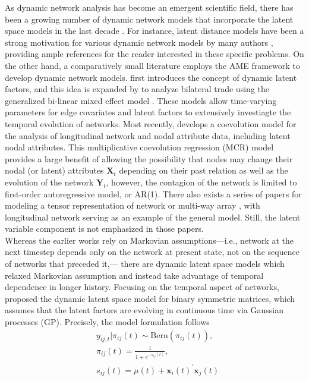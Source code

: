 \documentclass[a4paper]{article}
\begin{document}
As dynamic network analysis has become an emergent scientific field, there has been a growing number of dynamic network models that incorporate the latent space models in the last decade \citep{kim2017review}. For instance, latent distance models have been a strong motivation for various dynamic network models by many authors \citep{sarkar2005dynamic,sarkar2007latent,sewell2015latent,sewell2016latent,friel2016interlocking}, providing ample references for the reader interested in these specific problems. On the other hand, a comparatively small literature employs the AME framework to develop dynamic network models. \cite{ward2007persistent} first introduces the concept of dynamic latent factors, and this idea is expanded by \cite{ward2013gravity} to analyze bilateral trade using the generalized bi-linear mixed effect model \citep{hoff2005bilinear}. These models allow time-varying parameters for edge covariates and latent factors to extensively investiagte the temporal evolution of networks. Most recently, \cite{he2017multiplicative} develops a coevolution model for the analysis of longitudinal network and nodal attribute data, including latent nodal attributes. This multiplicative coevolution regression (MCR) model provides a large benefit of allowing the possibility that nodes may change their nodal (or latent) attributes $\mathbf{X}_t$ depending on their past relation as well as the evolution of the network $\mathbf{Y}_t$, however, the contagion of the network is limited to first-order autoregressive model, or AR(1). There also exists a series of papers for modeling a tensor representation of network or multi-way array \citep{hoff2011hierarchical,hoff2011separable,hoff2015multilinear,minhas2016new}, with longitudinal network serving as an example of the general model. Still, the latent variable component is not emphasized in those papers. \\ \newline
Whereas the earlier works rely on Markovian assumptions---i.e., network at the next timestep depends only on the network at present state, not on the sequence of networks that preceded it,--- there are dynamic latent space models which relaxed Markovian assumption and instead take advantage of temporal dependence in longer history. Focusing on the temporal aspect of networks, \cite{durante2013nonparametric} proposed the dynamic latent space model for binary symmetric matrices, which 
		assumes that the latent factors are evolving in continuous time via Gaussian processes (GP). Precisely, the model formulation follows
		\begin{equation}\label{DuranteDunson}
			\begin{aligned}
				&y_{ij, t}|\pi_{ij}(t) \sim \mbox{Bern}(\pi_{ij}(t)),\\
				& \pi_{ij}(t) = \frac{1}{1+e^{-s_{ij}(t)}},\\
				& s_{ij}(t) = \mu(t) + \boldsymbol{x}_i(t)^\prime \boldsymbol{x}_j(t)
			\end{aligned}
		\end{equation}
\end{document}
